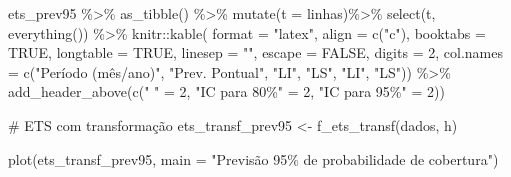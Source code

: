 \documentclass[
  letterpaper,
  DIV=11,
  numbers=noendperiod]{scrartcl}
\newenvironment{Shaded}{\begin{snugshade}}{\end{snugshade}}
\newcommand{\AttributeTok}[1]{\textcolor[rgb]{0.40,0.45,0.13}{#1}}
\newcommand{\CommentTok}[1]{\textcolor[rgb]{0.37,0.37,0.37}{#1}}
\newcommand{\ConstantTok}[1]{\textcolor[rgb]{0.56,0.35,0.01}{#1}}
\newcommand{\DecValTok}[1]{\textcolor[rgb]{0.68,0.00,0.00}{#1}}
\newcommand{\FunctionTok}[1]{\textcolor[rgb]{0.28,0.35,0.67}{#1}}
\newcommand{\NormalTok}[1]{\textcolor[rgb]{0.00,0.23,0.31}{#1}}
\newcommand{\OtherTok}[1]{\textcolor[rgb]{0.00,0.23,0.31}{#1}}
\newcommand{\SpecialCharTok}[1]{\textcolor[rgb]{0.37,0.37,0.37}{#1}}
\newcommand{\StringTok}[1]{\textcolor[rgb]{0.13,0.47,0.30}{#1}}
\begin{document}
\begin{Shaded}
\begin{Highlighting}[]
\NormalTok{ets\_prev95 }\SpecialCharTok{\%\textgreater{}\%} 
  \FunctionTok{as\_tibble}\NormalTok{() }\SpecialCharTok{\%\textgreater{}\%}
  \FunctionTok{mutate}\NormalTok{(}\AttributeTok{t =}\NormalTok{ linhas)}\SpecialCharTok{\%\textgreater{}\%}
  \FunctionTok{select}\NormalTok{(t, }\FunctionTok{everything}\NormalTok{()) }\SpecialCharTok{\%\textgreater{}\%}
\NormalTok{  knitr}\SpecialCharTok{::}\FunctionTok{kable}\NormalTok{(}
      \AttributeTok{format =} \StringTok{"latex"}\NormalTok{,}
      \AttributeTok{align =} \FunctionTok{c}\NormalTok{(}\StringTok{"c"}\NormalTok{),}
      \AttributeTok{booktabs =} \ConstantTok{TRUE}\NormalTok{,}
      \AttributeTok{longtable =} \ConstantTok{TRUE}\NormalTok{,}
      \AttributeTok{linesep =} \StringTok{""}\NormalTok{,}
      \AttributeTok{escape =} \ConstantTok{FALSE}\NormalTok{,}
      \AttributeTok{digits =} \DecValTok{2}\NormalTok{,}
      \AttributeTok{col.names =} \FunctionTok{c}\NormalTok{(}\StringTok{"Período (mês/ano)"}\NormalTok{, }\StringTok{"Prev. Pontual"}\NormalTok{, }\StringTok{"LI"}\NormalTok{, }\StringTok{"LS"}\NormalTok{, }\StringTok{"LI"}\NormalTok{, }\StringTok{"LS"}\NormalTok{)) }\SpecialCharTok{\%\textgreater{}\%}
    \FunctionTok{add\_header\_above}\NormalTok{(}\FunctionTok{c}\NormalTok{(}\StringTok{" "} \OtherTok{=} \DecValTok{2}\NormalTok{, }\StringTok{"IC para 80\%"} \OtherTok{=} \DecValTok{2}\NormalTok{, }\StringTok{"IC para 95\%"} \OtherTok{=} \DecValTok{2}\NormalTok{))}


\CommentTok{\# ETS com transformação}
\NormalTok{ets\_transf\_prev95 }\OtherTok{\textless{}{-}} \FunctionTok{f\_ets\_transf}\NormalTok{(dados, h)}

\FunctionTok{plot}\NormalTok{(ets\_transf\_prev95, }\AttributeTok{main =} \StringTok{"Previsão 95\% de probabilidade de cobertura"}\NormalTok{)}


\end{Highlighting}
\end{Shaded}
\end{document}
